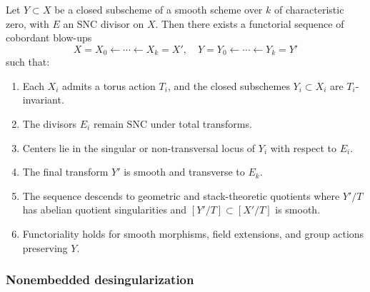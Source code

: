 \documentclass{amsart}
\begin{document}
\begin{theorem}\label{embedded}
Let \( Y \subset X \) be a closed subscheme of a smooth scheme over \( k \) of characteristic zero, with \( E \) an SNC divisor on \( X \). Then there exists a functorial sequence of cobordant blow-ups
\[
X = X_0 \leftarrow \cdots \leftarrow X_k = X', \quad Y = Y_0 \leftarrow \cdots \leftarrow Y_k = Y'
\]
such that:
\begin{enumerate}
    \item Each \( X_i \) admits a torus action \( T_i \), and the closed subschemes \( Y_i \subset X_i \) are \( T_i \)-invariant.
    \item The divisors \( E_i \) remain SNC under  total transforms.
    \item Centers lie in the singular or non-transversal locus of \( Y_i \) with respect to \( E_i \).
    \item The final transform \( Y' \) is smooth and transverse to \( E_k \).
    \item The sequence descends to geometric and stack-theoretic quotients where \( Y'/T \) has abelian quotient singularities and \( [Y'/T] \subset [X'/T] \) is smooth.
    \item Functoriality holds for smooth morphisms, field extensions, and group actions preserving \( Y \).
\end{enumerate}
\end{theorem}


\subsubsection{Nonembedded desingularization}
\end{document}
